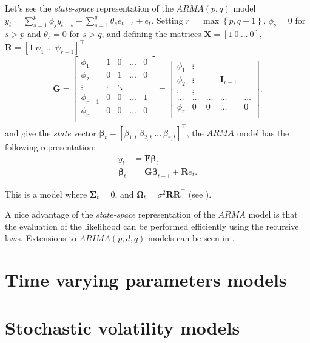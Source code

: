 Let's see the \textit{state-space} representation of the $ARMA(p,q)$ model $y_t=\sum_{s=1}^{p}\phi_jy_{t-s}+\sum_{s=1}^{q}\theta_s e_{t-s}+e_t$. Setting $r=\max \left\{p,q+1\right\}$, $\phi_s=0$ for $s>p$ and $\theta_s=0$ for $s>q$, and defining the matrices $\bm{X}=[1 \ 0 \ \dots \ 0]$, $\bm{R}=[1 \ \psi_1 \ \dots \ \psi_{r-1}]^{\top}$ 
\begin{align*}
	\bm{G}=\begin{bmatrix}
		\phi_1 & 1 & 0 & \dots & 0\\
		\phi_2 & 0 & 1 & \dots & 0\\
		\vdots & \vdots & \ddots &  &\\
		 \phi_{r-1} & 0 & 0 & \dots & 1\\
		 \phi_r & 0 & 0 & \dots & 0\\
	\end{bmatrix} = \begin{bmatrix}
	\phi_1 & \vdots &  &  & \\
	\phi_2 & \vdots &  & \bm{I}_{r-1}  & \\
	\vdots & \vdots &  &  &\\
	\dots & \dots & \dots & \dots & \dots\\
	\phi_r & 0 & 0 & \dots & 0\\
\end{bmatrix}.
\end{align*} 
and give the \textit{state} vector $\bm{\beta}_t=[\beta_{1,t} \ \beta_{2,t} \ \dots \ \beta_{r,t}]^{\top}$, the $ARMA$ model has the following representation:
\begin{align*}
	y_t&=\bm{F}\bm{\beta}_t\\
	\bm{\beta}_t &= \bm{G}\bm{\beta}_{t-1}+\bm{R}e_{t}.
\end{align*}

This is a model where $\bm{\Sigma}_t=0$, and $\bm{\Omega}_t=\sigma^2\bm{R}\bm{R}^{\top}$ (see \cite{petris2009dynamic,chib1994bayes}).

A nice advantage of the \textit{state-space} representation of the $ARMA$ model is that the evaluation of the likelihood can be performed efficiently using the recursive laws. Extensions to $ARIMA(p,d,q)$ models can be seen in \cite[Chap.~3]{petris2009dynamic}.


\section{Time varying parameters models}\label{sec83}        
     

\section{Stochastic volatility models}\label{sec84}  



